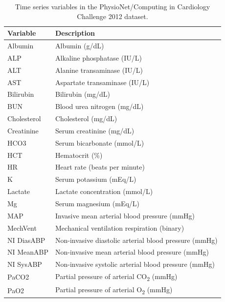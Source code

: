\documentclass[preprint,12pt]{elsarticle}
\begin{document}
\begin{table}[h!]
    \centering
    \caption{Time series variables in the PhysioNet/Computing in Cardiology Challenge 2012 dataset.}
    \begin{small}
    \begin{tabularx}{\textwidth}{lX}
        \toprule
        \textbf{Variable} & \textbf{Description} \\
        \midrule
        Albumin           & Albumin (g/dL) \\
        ALP               & Alkaline phosphatase (IU/L) \\
        ALT               & Alanine transaminase (IU/L) \\
        AST               & Aspartate transaminase (IU/L) \\
        Bilirubin         & Bilirubin (mg/dL) \\
        BUN               & Blood urea nitrogen (mg/dL) \\
        Cholesterol       & Cholesterol (mg/dL) \\
        Creatinine        & Serum creatinine (mg/dL) \\
        HCO3              & Serum bicarbonate (mmol/L) \\
        HCT               & Hematocrit (\%) \\
        HR                & Heart rate (beats per minute) \\
        K                 & Serum potassium (mEq/L) \\
        Lactate           & Lactate concentration (mmol/L) \\
        Mg                & Serum magnesium (mEq/L) \\
        MAP               & Invasive mean arterial blood pressure (mmHg) \\
        MechVent          & Mechanical ventilation respiration (binary) \\
        NI DiasABP        & Non-invasive diastolic arterial blood pressure (mmHg) \\
        NI MeanABP        & Non-invasive mean arterial blood pressure (mmHg) \\
        NI SysABP         & Non-invasive systolic arterial blood pressure (mmHg) \\
        PaCO2             & Partial pressure of arterial CO\textsubscript{2} (mmHg) \\
        PaO2              & Partial pressure of arterial O\textsubscript{2} (mmHg) \\

\end{tabularx}
\end{small}
\end{table}
\end{document}
